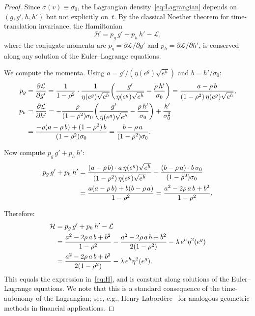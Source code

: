 \documentclass[12pt]{article}
\begin{document}
\begin{proof}
Since $\sigma(v)\equiv\sigma_0$, the Lagrangian density~\eqref{eq:Lagrangian} depends
on $(g,g',h,h')$ but not explicitly on~$t$. By the classical Noether theorem for
time-translation invariance, the Hamiltonian
\[
\mathcal{H} = p_g\,g' + p_h\,h' - \mathcal{L},
\]
where the conjugate momenta are $p_g = \partial\mathcal{L}/\partial g'$ and
$p_h = \partial\mathcal{L}/\partial h'$, is conserved along any solution of the
Euler--Lagrange equations.

We compute the momenta. Using $a = g'/(\eta(e^g)\sqrt{e^h})$ and $b = h'/\sigma_0$:
\begin{align}
p_g &= \frac{\partial\mathcal{L}}{\partial g'}
  = \frac{1}{1-\rho^2}\cdot\frac{1}{\eta(e^g)\sqrt{e^h}}
    \biggl(\frac{g'}{\eta(e^g)\sqrt{e^h}} - \frac{\rho\,h'}{\sigma_0}\biggr)
  = \frac{a - \rho\,b}{(1-\rho^2)\,\eta(e^g)\sqrt{e^h}}, \label{eq:pg} \\
p_h &= \frac{\partial\mathcal{L}}{\partial h'}
  = -\frac{\rho}{(1-\rho^2)\sigma_0}\biggl(\frac{g'}{\eta(e^g)\sqrt{e^h}}
    - \frac{\rho\,h'}{\sigma_0}\biggr) + \frac{h'}{\sigma_0^2} \notag \\
  &= \frac{-\rho(a-\rho\,b) + (1-\rho^2)\,b}{(1-\rho^2)\sigma_0}
  = \frac{b - \rho\,a}{(1-\rho^2)\sigma_0}. \label{eq:ph}
\end{align}

Now compute $p_g\,g' + p_h\,h'$:
\begin{align}
p_g\,g' + p_h\,h'
  &= \frac{(a-\rho\,b)\cdot a\,\eta(e^g)\sqrt{e^h}}{(1-\rho^2)\,\eta(e^g)\sqrt{e^h}}
   + \frac{(b-\rho\,a)\cdot b\,\sigma_0}{(1-\rho^2)\sigma_0} \notag \\
  &= \frac{a(a-\rho\,b) + b(b-\rho\,a)}{1-\rho^2}
  = \frac{a^2 - 2\rho\,a\,b + b^2}{1-\rho^2}. \label{eq:pggh}
\end{align}

Therefore:
\begin{align}
\mathcal{H} &= p_g\,g' + p_h\,h' - \mathcal{L} \notag \\
  &= \frac{a^2-2\rho\,a\,b+b^2}{1-\rho^2}
   - \frac{a^2-2\rho\,a\,b+b^2}{2(1-\rho^2)} - \lambda\,e^h\eta^2(e^g) \notag \\
  &= \frac{a^2-2\rho\,a\,b+b^2}{2(1-\rho^2)} - \lambda\,e^h\eta^2(e^g).
\end{align}
This equals the expression in~\eqref{eq:H}, and is constant along solutions of the
Euler--Lagrange equations. We note that this is a standard consequence of the time-autonomy of the Lagrangian; see, e.g., Henry-Labord\`ere~\cite{HenryLabordere} for analogous geometric methods in financial applications.
\end{proof}
\end{document}
